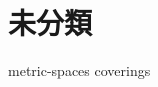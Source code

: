 \documentclass[uplatex, dvipdfmx, a4paper, 12pt, class=jsbook, crop=false]{standalone}
\begin{document}
\chapter{未分類}
\label{chap:uncategorized}

{metric-spaces}
{coverings}
\end{document}
